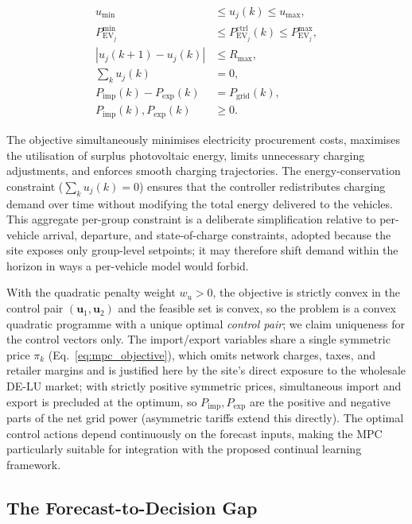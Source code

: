 \documentclass[journal]{IEEEtran}
\begin{document}
\begin{align}
u_{\min}
&\le
u_j(k)
\le
u_{\max},
\\
P_{\mathrm{EV}_j}^{\min}
&\le
P_{\mathrm{EV}_j}^{\mathrm{ctrl}}(k)
\le
P_{\mathrm{EV}_j}^{\max},
\\
|u_j(k+1)-u_j(k)|
&\le
R_{\max},
\\
\sum_k u_j(k)
&=
0,
\\
P_{\mathrm{imp}}(k)-P_{\mathrm{exp}}(k)
&=
P_{\mathrm{grid}}(k),
\\
P_{\mathrm{imp}}(k),
P_{\mathrm{exp}}(k)
&\ge
0.
\end{align}

The objective simultaneously minimises electricity procurement costs,
maximises the utilisation of surplus photovoltaic energy, limits
unnecessary charging adjustments, and enforces smooth charging
trajectories. The energy-conservation constraint
($\sum_k u_j(k)=0$) ensures that the controller redistributes charging
demand over time without modifying the total energy delivered to the
vehicles. This aggregate per-group constraint is a deliberate
simplification relative to per-vehicle arrival, departure, and
state-of-charge constraints, adopted because the site exposes only
group-level setpoints; it may therefore shift demand within the horizon
in ways a per-vehicle model would forbid.

With the quadratic penalty weight $w_u>0$, the objective is strictly
convex in the control pair $(\mathbf{u}_1,\mathbf{u}_2)$ and the feasible
set is convex, so the problem is a convex quadratic programme with a
unique optimal \emph{control pair}; we claim uniqueness for the control
vectors only. The import/export variables share a single symmetric price
$\pi_k$ (Eq.~\eqref{eq:mpc_objective}), which omits network charges,
taxes, and retailer margins and is justified here by the site's direct
exposure to the wholesale DE-LU market; with strictly positive symmetric
prices, simultaneous import and export is precluded at the optimum, so
$P_{\mathrm{imp}},P_{\mathrm{exp}}$ are the positive and negative parts of
the net grid power (asymmetric tariffs extend this directly). The optimal
control actions depend continuously on the forecast inputs, making the
MPC particularly suitable for integration with the proposed continual
learning framework.

\subsection{The Forecast-to-Decision Gap}
\label{sec:forecast_decision_gap}
\end{document}
